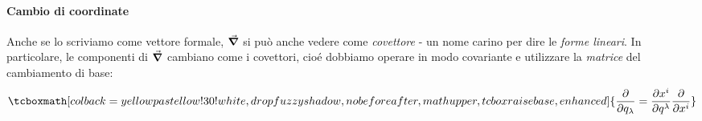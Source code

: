 \paragraph{Cambio di coordinate} %
Anche se lo scriviamo come vettore formale, $\grad$ si può anche vedere come \textit{covettore} - un nome carino per dire le \textit{forme lineari}. In particolare, le componenti di $\grad$ cambiano come i covettori, cioé dobbiamo operare in modo covariante e utilizzare la \textit{matrice} del cambiamento di base:
\begin{equation}
	\tcboxmath[colback=yellowpastellow!30!white,drop fuzzy shadow, nobeforeafter, math upper, tcbox raise base, enhanced]{\pdv{q_\lambda}=\pdv{x^i}{q^\lambda}\pdv{x^i}}
\end{equation}
